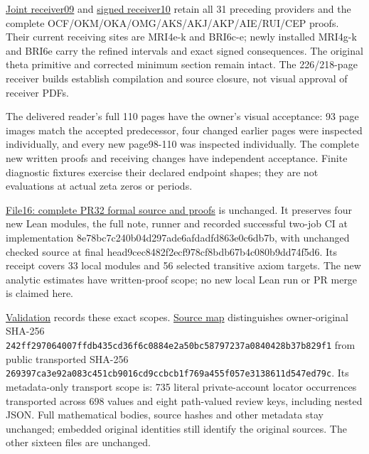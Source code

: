 \documentclass[
]{article}
\begin{document}
\href{https://github.com/KokunoYumeto/zeta-function-research-reader/blob/dad07e28faa735104ddc0b137521620fc315e6fc/workbenches/splitzero-tandem/continuations/20260914-exterior-kernel-continuation/09_UPDATED_JOINT_NOTE.tex}{Joint
receiver09} and
\href{https://github.com/KokunoYumeto/zeta-function-research-reader/blob/dad07e28faa735104ddc0b137521620fc315e6fc/workbenches/splitzero-tandem/continuations/20260914-exterior-kernel-continuation/10_UPDATED_SIGNED_RETURN.tex}{signed
receiver10} retain all 31 preceding providers and the complete
OCF/OKM/OKA/OMG/AKS/AKJ/AKP/AIE/RUI/CEP proofs. Their current receiving
sites are MRI4e-k and BRI6c-e; newly installed MRI4g-k and BRI6e carry
the refined intervals and exact signed consequences. The original theta
primitive and corrected minimum section remain intact. The 226/218-page
receiver builds establish compilation and source closure, not visual
approval of receiver PDFs.

The delivered reader's full 110 pages have the owner's visual
acceptance: 93 page images match the accepted predecessor, four changed
earlier pages were inspected individually, and every new page98-110 was
inspected individually. The complete new written proofs and receiving
changes have independent acceptance. Finite diagnostic fixtures exercise
their declared endpoint shapes; they are not evaluations at actual zeta
zeros or periods.

\href{https://github.com/KokunoYumeto/zeta-function-research-reader/blob/dad07e28faa735104ddc0b137521620fc315e6fc/workbenches/splitzero-tandem/continuations/20260914-exterior-kernel-continuation/16_PR32_FORMAL_SOURCE_AND_PROOFS.md}{File16:
complete PR32 formal source and proofs} is unchanged. It preserves four
new Lean modules, the full note, runner and recorded successful two-job
CI at implementation 8e78bc7c240b04d297ade6afdadfd863e0c6db7b, with
unchanged checked source at final
head9cec8482f2ecf978cf8bdb67b4c080b9dd74f5d6. Its receipt covers 33
local modules and 56 selected transitive axiom targets. The new analytic
estimates have written-proof scope; no new local Lean run or PR merge is
claimed here.

\href{https://github.com/KokunoYumeto/zeta-function-research-reader/blob/dad07e28faa735104ddc0b137521620fc315e6fc/workbenches/splitzero-tandem/continuations/20260914-exterior-kernel-continuation/12_VALIDATION.md}{Validation}
records these exact scopes.
\href{https://github.com/KokunoYumeto/zeta-function-research-reader/blob/dad07e28faa735104ddc0b137521620fc315e6fc/workbenches/splitzero-tandem/continuations/20260914-exterior-kernel-continuation/11_SOURCE_MAP.json}{Source
map} distinguishes owner-original SHA-256
\texttt{242ff297064007ffdb435cd36f6c0884e2a50bc58797237a0840428b37b829f1}
from public transported SHA-256
\texttt{269397ca3e92a083c451cb9016cd9ccbcb1f769a455f057e3138611d547ed79c}.
Its metadata-only transport scope is: 735 literal private-account
locator occurrences transported across 698 values and eight path-valued
review keys, including nested JSON. Full mathematical bodies, source
hashes and other metadata stay unchanged; embedded original identities
still identify the original sources. The other sixteen files are
unchanged.
\end{document}
